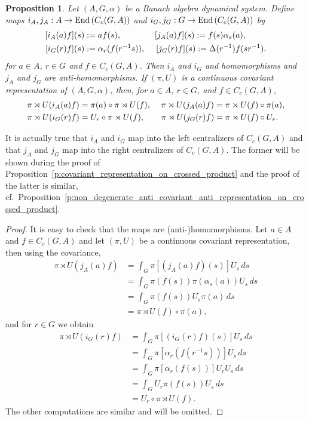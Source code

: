 \documentclass{amsart}
\theoremstyle{plain}
\newtheorem{prop}[theorem]{Proposition}
\theoremstyle{definition}
\numberwithin{equation}{section}
\begin{document}
\begin{prop}\label{p:i_j_A_G_properties}
 Let ${(A,G,\alpha)}$ be a Banach algebra dynamical system. Define maps $i_A, j_A: A \to {\textup{End\,}}(C_c(G,A))$ and $i_G, j_G: G \to {\textup{End\,}}(C_c(G,A))$ by
\begin{align}\label{e:i_definitions}
 [i_A(a)f](s) &:= af(s),  \quad \quad \quad \quad [j_A(a)f](s) := f(s) \alpha_s(a), \\
 [i_G(r)f](s) &:= \alpha_r(f(r^{-1}s)), \quad \; [j_G(r)f](s) := \Delta(r^{-1}) f(sr^{-1}). \notag
\end{align}
for $a \in A$, $r \in G$ and $f \in C_c(G,A)$. Then $i_A$ and $i_G$ and homomorphisms and $j_A$ and $j_G$ are anti-homomorphisms. If ${(\pi,U)}$ is a continuous covariant representation of ${(A,G,\alpha)}$, then, for $a \in A$, $r \in G$, and $f \in C_c(G,A)$,
\begin{align}\label{e:intforms_of_i_j_A_G}
 {\pi \rtimes U}(i_A(a)f) &= \pi(a) \circ {\pi \rtimes U}(f), \quad \, {\pi \rtimes U}(j_A(a)f) = {\pi \rtimes U}(f) \circ \pi(a), \\
{\pi \rtimes U}(i_G(r)f) &= U_r \circ {\pi \rtimes U}(f), \quad \quad {\pi \rtimes U}(j_G(r)f) = {\pi \rtimes U}(f) \circ U_r . \notag
\end{align}
\end{prop}

It is actually true that $i_A$ and $i_G$ map into the left centralizers of $C_c(G,A)$ and that $j_A$ and $j_G$ map into the right centralizers of $C_c(G,A)$. The former will be shown during the proof of Proposition~\ref{p:covariant_representation_on_crossed_product} and the proof of the latter is similar, cf.\ Proposition~\ref{p:non_degenerate_anti_covariant_anti_representation_on_crossed_product}.

\begin{proof}
It is easy to check that the maps are (anti-)homomorphisms. Let $a \in A$ and $f \in C_c(G,A)$ and let ${(\pi,U)}$ be a continuous covariant representation, then using the covariance,
\begin{align*}
 {\pi \rtimes U}(j_A(a)f) &= \int_G \pi[(j_A(a)f)(s)] U_s {\,ds} \\
&= \int_G \pi(f(s)) \pi(\alpha_s(a)) U_s {\,ds} \\
&= \int_G \pi(f(s)) U_s \pi(a) {\,ds} \\
&= {\pi \rtimes U}(f) \circ \pi(a),
\end{align*}
and for $r \in G$ we obtain
\begin{align*}
 {\pi \rtimes U}(i_G(r)f) &= \int_G \pi[(i_G(r)f)(s)] U_s {\,ds} \\
&= \int_G \pi[ \alpha_r(f(r^{-1}s)) ] U_s {\,ds} \\
&= \int_G \pi[ \alpha_r(f(s)) ] U_r U_s {\,ds} \\
&= \int_G U_r \pi(f(s)) U_s {\,ds} \\
&= U_r \circ {\pi \rtimes U}(f).
\end{align*}
The other computations are similar and will be omitted.
\end{proof}
\end{document}
